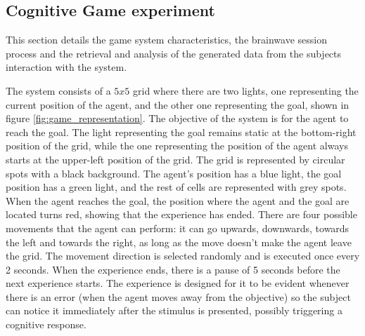 \documentclass[journal]{IEEEtran}
\begin{document}
\subsection{Cognitive Game experiment}
This section details the game system characteristics, the brainwave session process and the retrieval and analysis of the generated data from the subjects interaction with the system.

\label{cognitive_experiment_system}{
The system consists of a $5x5$ grid where there are two lights, one representing the current position of the agent, and the other one representing the goal, shown in figure  \ref{fig:game_representation}. The objective of the system is for the agent to reach the goal. The light representing the goal remains static at the bottom-right position of the grid, while the one representing the position of the agent always starts at the upper-left position of the grid. The grid is represented by circular spots with a black background. The agent's position has a blue light, the goal position has a green light, and the rest of cells are represented with grey spots. When the agent reaches the goal, the position where the agent and the goal are located turns red, showing that the experience has ended. There are four possible movements that the agent can perform: it can go upwards, downwards, towards the left and towards the right, as long as the move doesn't make the agent leave the grid. The movement direction is selected randomly and is executed once every 2 seconds. When the experience ends, there is a pause of 5 seconds before the next experience starts. The experience is designed for it to be evident whenever there is an error (when the agent moves away from the objective) so the subject can notice it immediately after the stimulus is presented, possibly triggering a cognitive response.

}
\end{document}
